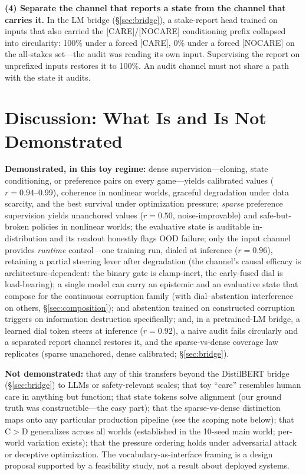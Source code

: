 \documentclass[11pt]{article}
\begin{document}
\textbf{(4) Separate the channel that reports a state from the channel that carries it.}
In the LM bridge (\S\ref{sec:bridge}), a stake-report head trained on inputs that also
carried the [CARE]/[NOCARE] conditioning prefix collapsed into circularity: 100\% under a
forced [CARE], 0\% under a forced [NOCARE] on the all-stakes set---the audit was reading
its own input. Supervising the report on unprefixed inputs restores it to 100\%. An audit
channel must not share a path with the state it audits.

\section{Discussion: What Is and Is Not Demonstrated}
\label{sec:discussion}

\textbf{Demonstrated, in this toy regime:} dense supervision---cloning, state conditioning, or preference pairs on every game---yields calibrated values ($r{=}0.94$--0.99), coherence in nonlinear worlds, graceful degradation under data scarcity, and the best survival under optimization pressure; \emph{sparse} preference supervision yields unanchored values ($r{=}0.50$, noise-improvable) and safe-but-broken policies in nonlinear worlds; the evaluative state is auditable in-distribution and its readout honestly flags OOD failure; only the input channel provides \emph{runtime} control---one training run, dialed at inference ($r{=}0.96$), retaining a partial steering lever after degradation (the channel's causal efficacy is architecture-dependent: the binary gate is clamp-inert, the early-fused dial is load-bearing); a single model can carry an epistemic and an evaluative state that compose for the continuous corruption family (with dial--abstention interference on others, \S\ref{sec:composition}); and abstention trained on constructed corruption triggers on information destruction specifically; and, in a pretrained-LM bridge, a learned dial token steers at inference ($r{=}0.92$), a naive audit fails circularly and a separated report channel restores it, and the sparse-vs-dense coverage law replicates (sparse unanchored, dense calibrated; \S\ref{sec:bridge}).

\textbf{Not demonstrated:} that any of this transfers beyond the DistilBERT bridge (\S\ref{sec:bridge}) to LLMs or safety-relevant scales; that toy ``care'' resembles human care in anything but function; that state tokens solve alignment (our ground truth was constructible---the easy part); that the sparse-vs-dense distinction maps onto any particular production pipeline (see the scoping note below); that C$>$D generalizes across all worlds (established in the 10-seed main world; per-world variation exists); that the pressure ordering holds under adversarial attack or deceptive optimization. The vocabulary-as-interface framing is a design proposal supported by a feasibility study, not a result about deployed systems.
\end{document}
